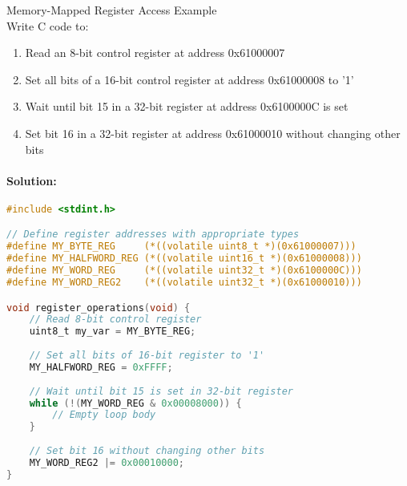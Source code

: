 \begin{example2}{Memory-Mapped Register Access Example}\\
Write C code to:
\begin{enumerate}
    \item Read an 8-bit control register at address 0x61000007
    \item Set all bits of a 16-bit control register at address 0x61000008 to '1'
    \item Wait until bit 15 in a 32-bit register at address 0x6100000C is set
    \item Set bit 16 in a 32-bit register at address 0x61000010 without changing other bits
\end{enumerate}

\tcblower
\paragraph{Solution:}
\begin{lstlisting}[language=C, style=basesmol]
#include <stdint.h>

// Define register addresses with appropriate types
#define MY_BYTE_REG     (*((volatile uint8_t *)(0x61000007)))
#define MY_HALFWORD_REG (*((volatile uint16_t *)(0x61000008)))
#define MY_WORD_REG     (*((volatile uint32_t *)(0x6100000C)))
#define MY_WORD_REG2    (*((volatile uint32_t *)(0x61000010)))

void register_operations(void) {
    // Read 8-bit control register
    uint8_t my_var = MY_BYTE_REG;
    
    // Set all bits of 16-bit register to '1'
    MY_HALFWORD_REG = 0xFFFF;
    
    // Wait until bit 15 is set in 32-bit register
    while (!(MY_WORD_REG & 0x00008000)) {
        // Empty loop body
    }
    
    // Set bit 16 without changing other bits
    MY_WORD_REG2 |= 0x00010000;
}
\end{lstlisting}
\end{example2}

